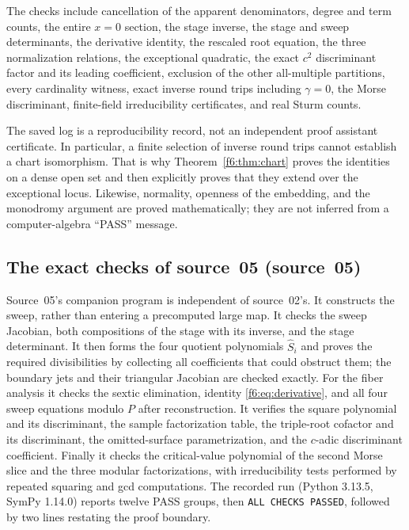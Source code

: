 \documentclass[11pt,a4paper]{article}
\theoremstyle{definition}
\newcommand{\src}[1]{\textup{(source~#1)}}
\begin{document}
The checks include cancellation of the apparent denominators, degree and
term counts, the entire $x=0$ section, the stage inverse, the stage and
sweep determinants, the derivative identity, the rescaled root equation,
the three normalization relations, the exceptional quadratic, the exact
$c^2$ discriminant factor and its leading coefficient, exclusion of the
other all-multiple partitions, every cardinality witness, exact inverse
round trips including $\gamma=0$, the Morse discriminant, finite-field
irreducibility certificates, and real Sturm counts.

The saved log is a reproducibility record, not an independent proof
assistant certificate. In particular, a finite selection of inverse
round trips cannot establish a chart isomorphism. That is why
Theorem~\ref{f6:thm:chart} proves the identities on a dense open set and
then explicitly proves that they extend over the exceptional locus.
Likewise, normality, openness of the embedding, and the monodromy
argument are proved mathematically; they are not inferred from a
computer-algebra ``PASS'' message.

\subsection{The exact checks of source~05 \src{05}}
Source~05's companion program is independent of source~02's. It constructs
the sweep, rather than entering a precomputed large map. It checks the sweep
Jacobian, both compositions of the stage with its inverse, and the stage
determinant. It then forms the four quotient polynomials $\widehat S_i$ and
proves the required divisibilities by collecting all coefficients that could
obstruct them; the boundary jets and their triangular Jacobian are checked
exactly. For the fiber analysis it checks the sextic elimination, identity
\eqref{f6:eq:derivative}, and all four sweep equations modulo $P$ after
reconstruction. It verifies the square polynomial and its discriminant, the
sample factorization table, the triple-root cofactor and its discriminant,
the omitted-surface parametrization, and the $c$-adic discriminant
coefficient. Finally it checks the critical-value polynomial of the second
Morse slice and the three modular factorizations, with irreducibility tests
performed by repeated squaring and gcd computations. The recorded run
(Python 3.13.5, SymPy 1.14.0) reports twelve PASS groups, then
\texttt{ALL CHECKS PASSED}, followed by two lines restating the proof
boundary.
\end{document}
